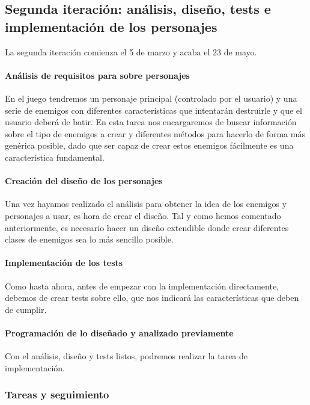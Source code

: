 \subsection{Segunda iteración: análisis, diseño, tests e implementación de los personajes}

La segunda iteración comienza el 5 de marzo y acaba el 23 de mayo.

\paragraph{Análisis de requisitos para sobre personajes} En el juego tendremos un personaje principal (controlado por el usuario) y una serie de enemigos con diferentes características que intentarán destruirle y que el usuario deberá de batir. En esta tarea nos encargaremos de buscar información sobre el tipo de enemigos a crear y diferentes métodos para hacerlo de forma más genérica posible, dado que ser capaz de crear estos enemigos fácilmente es una característica fundamental.

\paragraph{Creación del diseño de los personajes} Una vez hayamos realizado el análisis para obtener la idea de los enemigos y personajes a usar, es hora de crear el diseño. Tal y como hemos comentado anteriormente, es necesario hacer un diseño extendible donde crear diferentes clases de enemigos sea lo más sencillo posible.

\paragraph{Implementación de los tests} Como hasta ahora, antes de empezar con la implementación directamente, debemos de crear tests sobre ello, que nos indicará las características que deben de cumplir.

\paragraph{Programación de lo diseñado y analizado previamente} Con el análisis, diseño y tests listos, podremos realizar la tarea de implementación.

\subsubsection{Tareas y seguimiento}

